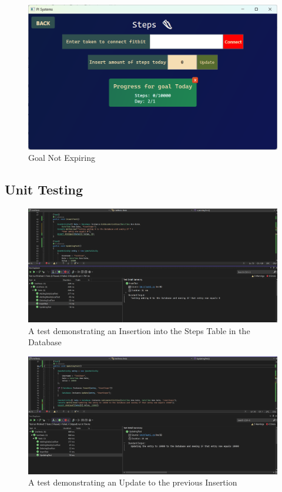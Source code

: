\documentclass[11pt]{article}
\begin{document}
\begin{figure}[!ht]
\centering
    \includegraphics[width=0.6\linewidth]{goalNotExpiring.png}
\caption{Goal Not Expiring}
\label{fig:ManualTest3}
\end{figure}


\newpage
\subsection{Unit Testing}
\begin{figure}[!ht]
\centering
    \includegraphics[width=\linewidth]{Insert.png}
\caption{A test demonstrating an Insertion into the Steps Table in the Database}
\label{fig:Database Unit Test 1}
\end{figure}

\begin{figure}[!ht]
\centering
    \includegraphics[width=\linewidth]{UpdatingTest.png}
\caption{A test demonstrating an Update to the previous Insertion}
\label{fig:Database Unit Test 2}
\end{figure}
\end{document}
